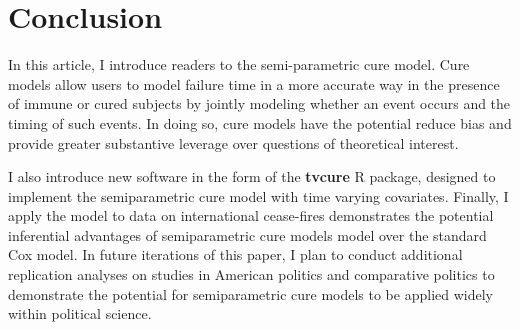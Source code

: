 \documentclass[letterpaper, 12pt]{article}
\theoremstyle{plain}
\begin{document}
\section{Conclusion}
In this article, I introduce readers to the semi-parametric cure model.%
Cure models allow users to model failure time in a more accurate way in the presence of immune or cured subjects by jointly modeling whether an event occurs and the timing of such events. In doing so, cure models have the potential reduce bias and provide greater substantive leverage over questions of theoretical interest.

I also introduce new software in the form of the \textbf{tvcure} R package, designed to implement the semiparametric cure model with time varying covariates. Finally, I apply the model to data on international cease-fires demonstrates the potential inferential advantages of semiparametric cure models model over the standard Cox model. In future iterations of this paper, I plan to conduct additional replication analyses on studies in American politics and comparative politics to demonstrate the potential for semiparametric cure models to be applied widely within political science.
\end{document}
